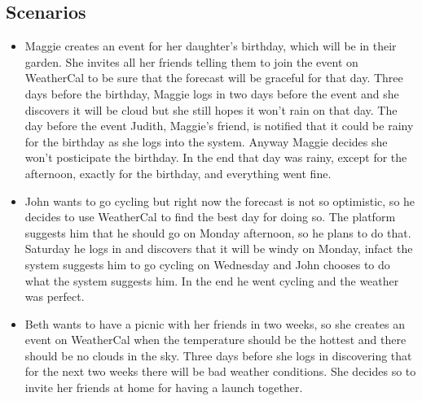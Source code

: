 \subsection{Scenarios}
\begin{itemize}
\item Maggie creates an event for her daughter's birthday, which will be in their garden. She invites all her friends telling them to join the event on WeatherCal to be sure that the forecast will be graceful for that day. Three days before the birthday, Maggie logs in two days before the event and she discovers it will be cloud but she still hopes it won't rain on that day. The day before the event Judith, Maggie's friend, is notified that it could be rainy for the birthday as she logs into the system. Anyway Maggie decides she won't posticipate the birthday. In the end that day was rainy, except for the afternoon, exactly for the birthday, and everything went fine.
\item John wants to go cycling but right now the forecast is not so optimistic, so he decides to use WeatherCal to find the best day for doing so. The platform suggests him that he should go on Monday afternoon, so he plans to do that. Saturday he logs in and discovers that it will be windy on Monday, infact the system suggests him to go cycling on Wednesday and John chooses to do what the system suggests him. In the end he went cycling and the weather was perfect.
\item Beth wants to have a picnic with her friends in two weeks, so she creates an event on WeatherCal when the temperature should be the hottest and there should be no clouds in the sky. Three days before she logs in discovering that for the next two weeks there will be bad weather conditions. She decides so to invite her friends at home for having a launch together.
\end{itemize}
